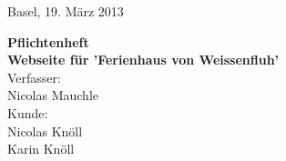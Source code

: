 \begin{titlepage}
\sffamily
\raggedleft
\small
Basel, 19. März 2013\\[40ex]
\raggedright
{\bfseries\Huge Pflichtenheft}\\[15ex]
{\bfseries\Large Webseite für 'Ferienhaus von Weissenfluh'}\\[10ex]
Verfasser:\\[1ex]
{\large Nicolas Mauchle}\\[5ex]
Kunde:\\[1ex]
{\large Nicolas Knöll}\\
{\large Karin Knöll}\\[10ex]

\end{titlepage}
